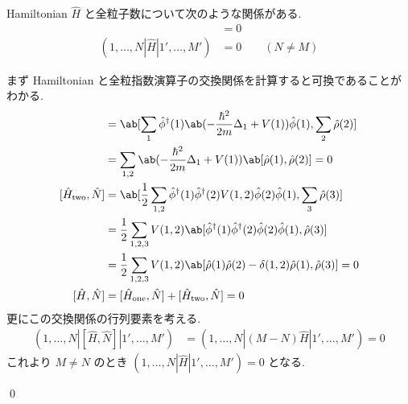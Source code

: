 \documentclass[uplatex,dvipdfmx,a4paper,11pt]{jlreq}
\makeatletter
\numberwithin{equation}{section}
\theoremstyle{definition}
\renewenvironment{proof}[1][\proofname]{\par
  \normalfont
  \topsep6\p@\@plus6\p@ \trivlist
  \item[\hskip\labelsep{\bfseries #1}\@addpunct{\bfseries}]\ignorespaces\quad\par
}{
  \qed\endtrivlist\@endpefalse
}
\renewcommand\proofname{証明}
\makeatother
\begin{document}
\begin{theorem}[Q21-94(iii)(iv)]
  Hamiltonian $\hat{H}$ と全粒子数について次のような関係がある.
  \begin{align}
    [\hat{H}, \hat{N}]                & = 0                   \\
    (1,\ldots,N|\hat{H}|1',\ldots,M') & = 0 \qquad (N \neq M)
  \end{align}
\end{theorem}
\begin{proof}
  まず Hamiltonian と全粒指数演算子の交換関係を計算すると可換であることがわかる.
  \begin{align}
    [\hat{H}_{\mathrm{one}}, \hat{N}] & = \ab[\sum_{1}\hat{\phi}^\dagger(1)\ab(-\frac{\hbar^2}{2m}\Delta_{1} + V(1))\hat{\phi}(1), \sum_2\hat{\rho}(2)]              \\
                                      & = \sum_{1,2}\ab(-\frac{\hbar^2}{2m}\Delta_{1} + V(1))\ab[\hat{\rho}(1), \hat{\rho}(2)] = 0                                   \\
    [\hat{H}_{\mathrm{two}}, \hat{N}] & = \ab[\frac{1}{2}\sum_{1,2}\hat{\phi}^\dagger(1)\hat{\phi}^\dagger(2)V(1, 2)\hat{\phi}(2)\hat{\phi}(1), \sum_3\hat{\rho}(3)] \\
                                      & = \frac{1}{2}\sum_{1,2,3}V(1, 2)\ab[\hat{\phi}^\dagger(1)\hat{\phi}^\dagger(2)\hat{\phi}(2)\hat{\phi}(1), \hat{\rho}(3)]     \\
                                      & = \frac{1}{2}\sum_{1,2,3}V(1, 2)\ab[\hat{\rho}(1)\hat{\rho}(2) - \delta(1, 2)\hat{\rho}(1), \hat{\rho}(3)] = 0               \\
    [\hat{H}, \hat{N}]                & = [\hat{H}_{\mathrm{one}}, \hat{N}] + [\hat{H}_{\mathrm{two}}, \hat{N}] = 0
  \end{align}
  更にこの交換関係の行列要素を考える.
  \begin{align}
    (1,\ldots,N|[\hat{H}, \hat{N}]|1',\ldots,M') & = (1,\ldots,N|(M - N)\hat{H}|1',\ldots,M') = 0
  \end{align}
  これより $M \neq N$ のとき $(1,\ldots,N|\hat{H}|1',\ldots,M') = 0$ となる.
\end{proof}
\end{document}
